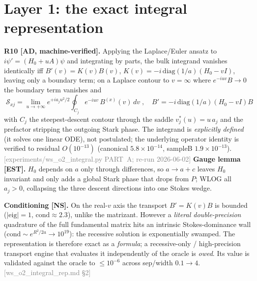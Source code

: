 \documentclass[aps,prd,reprint,nofootinbib]{revtex4-2}
\newcommand{\pnote}[1]{\textcolor{gray}{\footnotesize\,[#1]}}
\newcommand{\Scat}{\mathcal{S}}   %
\begin{document}
\section{Layer 1: the exact integral representation}\label{sec:O2}
\textbf{R10 [AD, machine-verified].} Applying the Laplace/Euler ansatz to $i\psi'=(H_0+uA)\psi$ and
integrating by parts, the bulk integrand vanishes identically iff
$B'(v)=K(v)B(v)$, $K(v)=-i\,\mathrm{diag}(1/a)(H_0-vI)$, leaving only a boundary term; on a Laplace
contour to $v=\infty$ where $e^{-iuv}B\to0$ the boundary term vanishes and
\begin{equation}
\boxed{\;\Scat_{xj}=\lim_{u\to+\infty}e^{+i a_j u^2/2}\!\oint_{C_j}\! e^{-iuv}\,B^{(x)}(v)\,dv\;,\quad
B'=-i\,\mathrm{diag}(1/a)(H_0-vI)B\;}
\end{equation}
with $C_j$ the steepest-descent contour through the saddle $v_j^*(u)=u\,a_j$ and the prefactor
stripping the outgoing Stark phase. The integrand is \emph{explicitly defined} (it solves one linear
ODE), not postulated; the underlying operator identity is verified to residual
$O(10^{-13})$ (canonical $5.8\times10^{-14}$, sampleB $1.9\times10^{-13}$).\pnote{experiments/ws\_o2\_integral.py PART~A; re-run 2026-06-02} \textbf{Gauge lemma [EST].}
$H_0$ depends on $a$ only through differences, so $a\to a+c$ leaves $H_0$ invariant and only adds a
global Stark phase that drops from $P$; WLOG all $a_j>0$, collapsing the three descent directions
into one Stokes wedge.

\textbf{Conditioning [NS].} On the real-$v$ axis the transport $B'=K(v)B$ is bounded
($|\mathrm{eig}|=1$, $\mathrm{cond}\approx2.3$), unlike the matrizant. However a \emph{literal
double-precision} quadrature of the full fundamental matrix hits an intrinsic Stokes-dominance wall
($\mathrm{cond}\sim e^{R^2/2a}\to10^{19}$): the recessive solution is exponentially swamped. The
representation is therefore exact as a \emph{formula}; a recessive-only / high-precision transport
engine that evaluates it independently of the oracle is \emph{owed}. Its value is validated against
the oracle to $\le10^{-6}$ across sep/width $0.1\to4$.\pnote{ws\_o2\_integral\_rep.md \S2}
\end{document}
